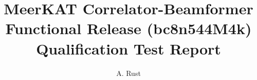 \documentclass[11pt,english,twoside]{article}
\author{A. Rust}
\begin{document}
\title{MeerKAT Correlator-Beamformer Functional Release  (bc8n544M4k) Qualification Test Report}
\makekatdocbeginning
\end{document}
